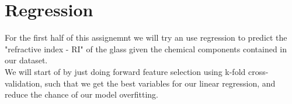 \section{Regression}
For the first half of this assignemnt we will try an use regression to predict the "refractive index - RI" of the glass given the chemical components contained in our dataset.\\
We will start of by just doing forward feature selection using k-fold cross-validation, such that we get the best variables for our linear regression, and reduce the chance of our model overfitting.\\


